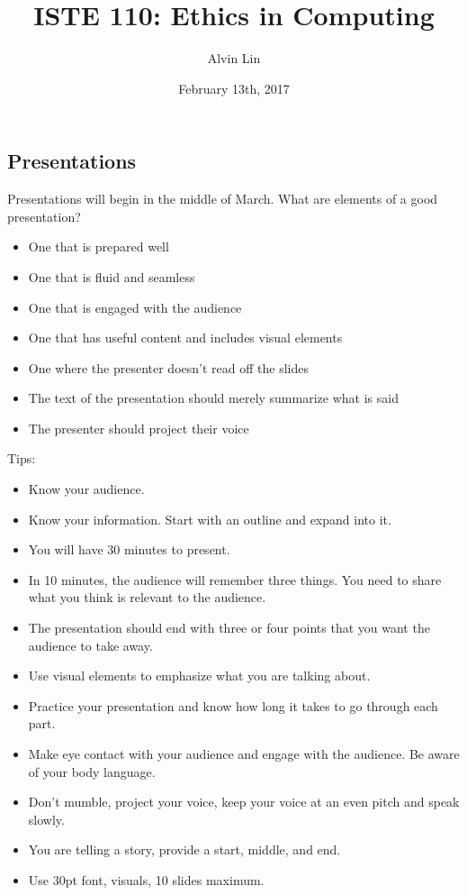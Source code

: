 \documentclass[letterpaper, 12pt]{article}
\title{ISTE 110: Ethics in Computing}
\author{Alvin Lin}
\date{February 13th, 2017}
\begin{document}
\maketitle

\subsection*{Presentations}
Presentations will begin in the middle of March.
What are elements of a good presentation?
\begin{itemize}
  \item One that is prepared well
  \item One that is fluid and seamless
  \item One that is engaged with the audience
  \item One that has useful content and includes visual elements
  \item One where the presenter doesn't read off the slides
  \item The text of the presentation should merely summarize what is said
  \item The presenter should project their voice
\end{itemize}
Tips:
\begin{itemize}
  \item Know your audience.
  \item Know your information. Start with an outline and expand into it.
  \item You will have 30 minutes to present.
  \item In 10 minutes, the audience will remember three things. You need to
    share what you think is relevant to the audience.
  \item The presentation should end with three or four points that you want
    the audience to take away.
  \item Use visual elements to emphasize what you are talking about.
  \item Practice your presentation and know how long it takes to go through
    each part.
  \item Make eye contact with your audience and engage with the audience. Be
    aware of your body language.
  \item Don't mumble, project your voice, keep your voice at an even pitch and
    speak slowly.
  \item You are telling a story, provide a start, middle, and end.
  \item Use 30pt font, visuals, 10 slides maximum.
\end{itemize}
\end{document}
